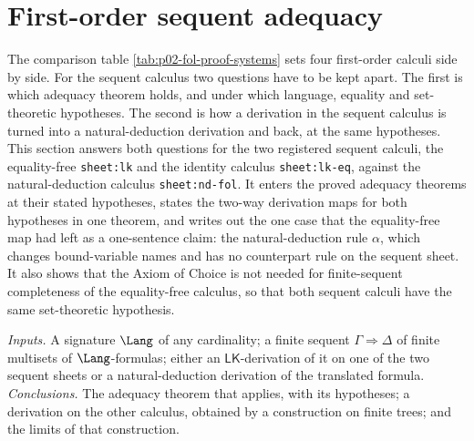 \section{First-order sequent adequacy}
\label{sec:p02-w02b-p02-019-lk-nd}

The comparison table \cref{tab:p02-fol-proof-systems} sets four first-order
calculi side by side.  For the sequent calculus two questions have to be kept
apart.  The first is which adequacy theorem holds, and under which language,
equality and set-theoretic hypotheses.  The second is how a derivation in the
sequent calculus is turned into a natural-deduction derivation and back, at
the same hypotheses.  This section answers both questions for the two
registered sequent calculi, the equality-free
\texttt{sheet:\allowbreak lk} and the identity calculus
\texttt{sheet:\allowbreak lk-eq}, against the natural-deduction
calculus \texttt{sheet:\allowbreak nd-fol}.  It enters the
proved adequacy theorems at their stated hypotheses, states the two-way
derivation maps for both hypotheses in one theorem, and writes out the one
case that the equality-free map had left as a one-sentence claim: the
natural-deduction rule \(\alpha\), which changes bound-variable names and has
no counterpart rule on the sequent sheet.  It also shows that the Axiom of
Choice is not needed for finite-sequent completeness of the equality-free
calculus, so that both sequent calculi have the same set-theoretic
hypothesis.

\emph{Inputs.}  A signature \(\Lang\) of any cardinality; a finite sequent
\(\Gamma\Rightarrow\Delta\) of finite multisets of \(\Lang\)-formulas; either
an \(\mathsf{LK}\)-derivation of it on one of the two sequent sheets or a
natural-deduction derivation of the translated formula.
\emph{Conclusions.}  The adequacy theorem that applies, with its hypotheses;
a derivation on the other calculus, obtained by a construction on finite
trees; and the limits of that construction.

